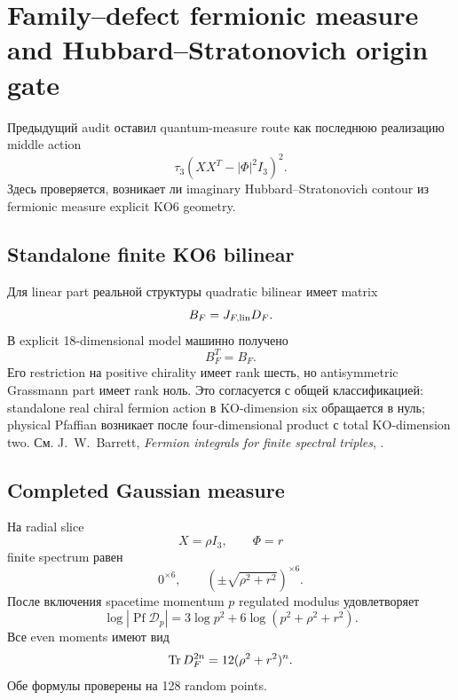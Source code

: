 \chapter{Family--defect fermionic measure and Hubbard--Stratonovich origin gate}

Предыдущий audit оставил quantum-measure route как последнюю реализацию
middle action
\begin{equation}
 \tau_3(XX^T-|\Phi|^2I_3)^2.
\end{equation}
Здесь проверяется, возникает ли imaginary Hubbard--Stratonovich contour из
fermionic measure explicit KO6 geometry.

\section{Standalone finite KO6 bilinear}

Для linear part реальной структуры quadratic bilinear имеет matrix
\begin{equation}
 B_F=J_{F,\rm lin}D_F.
\end{equation}
В explicit 18-dimensional model машинно получено
\begin{equation}
 B_F^T=B_F.
\end{equation}
Его restriction на positive chirality имеет rank шесть, но antisymmetric
Grassmann part имеет rank ноль. Это согласуется с общей классификацией:
standalone real chiral fermion action в KO-dimension six обращается в нуль;
physical Pfaffian возникает после four-dimensional product с total
KO-dimension two. См. J.~W.~Barrett,
\emph{Fermion integrals for finite spectral triples},
.

\section{Completed Gaussian measure}

На radial slice
\begin{equation}
 X=\rho I_3,
 \qquad
 \Phi=r
\end{equation}
finite spectrum равен
\begin{equation}
 0^{\times6},
 \qquad
 \left(\pm\sqrt{\rho^2+r^2}\right)^{\times6}.
\end{equation}
После включения spacetime momentum \(p\) regulated modulus удовлетворяет
\begin{equation}
 \boxed{
 \log|\operatorname{Pf}\mathcal D_p|
 =3\log p^2+6\log(p^2+\rho^2+r^2).}
 \label{eq:family-final-pfaffian-sum}
\end{equation}
Все even moments имеют вид
\begin{equation}
 \operatorname{Tr} D_F^{2n}=12(\rho^2+r^2)^n.
 \label{eq:family-final-even-moments}
\end{equation}
Обе формулы проверены на 128 random points.

